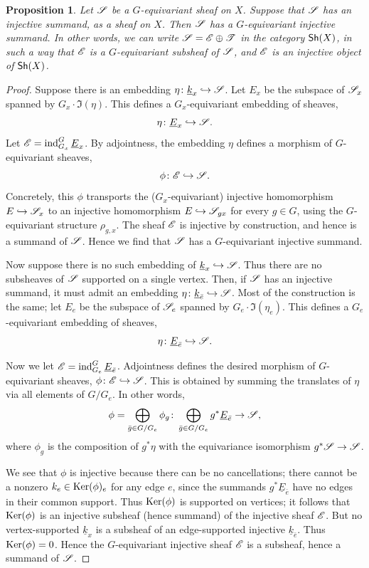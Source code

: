 \documentclass[letter]{amsart}
\newtheorem{proposition}[thm]{Proposition}
\theoremstyle{definition}
\theoremstyle{remark}
\numberwithin{thm}{section}
\numberwithin{equation}{section}
\newcommand{\constsheaf}[1]{{\underline{#1}}}
\begin{document}
\begin{proposition}
\label{inj-summand}
Let ${\mathscr{S}}$ be a $G$-equivariant sheaf on $X$.  Suppose that ${\mathscr{S}}$ has an injective summand, as a sheaf on $X$.  Then ${\mathscr{S}}$ has a $G$-equivariant injective summand.  In other words, we can write ${\mathscr{S}} = {\mathscr{E}} \oplus {\mathscr{T}}$ in the category ${\mathsf{Sh}}(X)$, in such a way that ${\mathscr{E}}$ is a $G$-equivariant subsheaf of ${\mathscr{S}}$, and ${\mathscr{E}}$ is an injective object of ${\mathsf{Sh}}(X)$.
\end{proposition}
\begin{proof}
Suppose there is an embedding $\eta \From \constsheaf{k}_x \Into \sheaf{S}$.  Let $E_x$ be the subspace of ${\mathscr{S}}_x$ spanned by $G_x \cdot \Im(\eta)$.  This defines a $G_x$-equivariant embedding of sheaves,
$$\eta \From \constsheaf{E}_x \Into \sheaf{S}.$$
Let $\sheaf{E} = \ind_{G_x}^G \constsheaf{E}_x$.  By adjointness, the embedding $\eta$ defines a morphism of $G$-equivariant sheaves,
$$\phi \colon {\mathscr{E}} \hookrightarrow {\mathscr{S}}.$$
Concretely, this $\phi$ transports the ($G_x$-equivariant) injective homomorphism $E \hookrightarrow {\mathscr{S}}_x$ to an injective homomorphism $E \hookrightarrow {\mathscr{S}}_{gx}$ for every $g \in G$, using the $G$-equivariant structure $\rho_{g,x}$.  The sheaf ${\mathscr{E}}$ is injective by construction, and hence is a summand of ${\mathscr{S}}$.  Hence we find that ${\mathscr{S}}$ has a $G$-equivariant injective summand.

Now suppose there is no such embedding of $\constsheaf{k}_x \Into \sheaf{S}$.  Thus there are no subsheaves of ${\mathscr{S}}$ supported on a single vertex.  Then, if ${\mathscr{S}}$ has an injective summand, it must admit an embedding $\eta \From \constsheaf{k}_{\bar e} \Into \sheaf{S}$.  Most of the construction is the same; let $E_e$ be the subspace of ${\mathscr{S}}_e$ spanned by $G_e \cdot \Im(\eta_e)$.  This defines a $G_e$-equivariant embedding of sheaves,
$$\eta \From \constsheaf{E}_{\bar e} \Into \sheaf{S}.$$

Now we let $\sheaf{E} = \ind_{G_e}^G \constsheaf{E}_{\bar e}$.  Adjointness defines the desired morphism of $G$-equivariant sheaves, $\phi \colon {\mathscr{E}} \hookrightarrow {\mathscr{S}}$.  This is obtained by summing the translates of $\eta$ via all elements of $G / G_e$.  In other words,
$$\phi = \bigoplus_{\bar g \in G / G_e} \phi_g \From \bigoplus_{\bar g \in G / G_e} g^\ast \constsheaf{E}_{\bar e} \To \sheaf{S},$$
where $\phi_g$ is the composition of $g^\ast \eta$ with the equivariance isomorphism $g^\ast {\mathscr{S}} \rightarrow {\mathscr{S}}$.  

We see that $\phi$ is injective because there can be no cancellations; there cannot be a nonzero $k_e \in \operatorname{Ker}(\phi)_e$ for any edge $e$, since the summands $g^\ast \constsheaf{E}_{\bar e}$ have no edges in their common support.  Thus $\operatorname{Ker}(\phi)$ is supported on vertices; it follows that $\operatorname{Ker}(\phi)$ is an injective subsheaf (hence summand) of the injective sheaf ${\mathscr{E}}$.  But no vertex-supported $\constsheaf{k}_x$ is a subsheaf of an edge-supported injective $\constsheaf{k}_{\bar e}$.  Thus $\operatorname{Ker}(\phi) = 0$.  Hence the $G$-equivariant injective sheaf ${\mathscr{E}}$ is a subsheaf, hence a summand of ${\mathscr{S}}$.
\end{proof}
\end{document}
